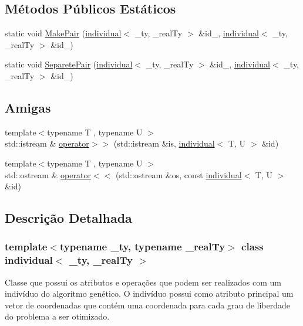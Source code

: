 \subsection*{Métodos Públicos Estáticos}
\begin{DoxyCompactItemize}
\item 
static void \hyperlink{classindividual_a848c15d022ac9f2b446b45d7fae7ddd0}{MakePair} (\hyperlink{classindividual}{individual}$<$ \_\-ty, \_\-realTy $>$ \&id\_, \hyperlink{classindividual}{individual}$<$ \_\-ty, \_\-realTy $>$ \&id\_)
\item 
static void \hyperlink{classindividual_a3f064fc3cf1612ef6cd2ffda4cb7610c}{SeparetePair} (\hyperlink{classindividual}{individual}$<$ \_\-ty, \_\-realTy $>$ \&id\_, \hyperlink{classindividual}{individual}$<$ \_\-ty, \_\-realTy $>$ \&id\_)
\end{DoxyCompactItemize}
\subsection*{Amigas}
\begin{DoxyCompactItemize}
\item 
{\footnotesize template$<$typename T , typename U $>$ }\\std::istream \& \hyperlink{classindividual_a11c97e7fa3954c61cc91282d96d1ae2d}{operator$>$$>$} (std::istream \&is, \hyperlink{classindividual}{individual}$<$ T, U $>$ \&id)
\item 
{\footnotesize template$<$typename T , typename U $>$ }\\std::ostream \& \hyperlink{classindividual_a90bc9541f07077cb6af916fd8dd2eca2}{operator$<$$<$} (std::ostream \&os, const \hyperlink{classindividual}{individual}$<$ T, U $>$ \&id)
\end{DoxyCompactItemize}


\subsection{Descrição Detalhada}
\subsubsection*{template$<$typename \_\-ty, typename \_\-realTy$>$ class individual$<$ \_\-ty, \_\-realTy $>$}

Classe que possui os atributos e operações que podem ser realizados com um indivíduo do algoritmo genético. O indivíduo possui como atributo principal um vetor de coordenadas que contém uma coordenada para cada grau de liberdade do problema a ser otimizado.


